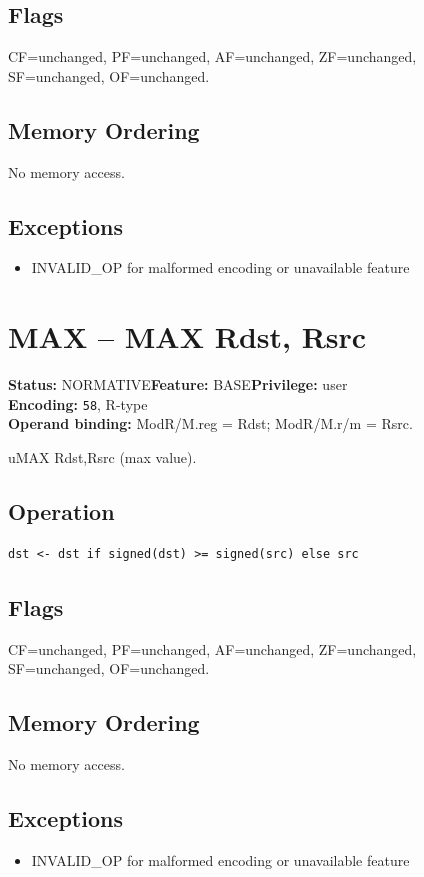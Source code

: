 \documentclass[10pt]{article}
\begin{document}
\subsection*{Flags}
CF=unchanged, PF=unchanged, AF=unchanged, ZF=unchanged, SF=unchanged, OF=unchanged.
\subsection*{Memory Ordering}
No memory access.
\subsection*{Exceptions}
\begin{itemize}
\item INVALID\_OP for malformed encoding or unavailable feature
\end{itemize}
\clearpage

\section{MAX -- MAX Rdst, Rsrc}
\textbf{Status:} NORMATIVE\quad \textbf{Feature:} BASE\quad \textbf{Privilege:} user\\
\textbf{Encoding:} \texttt{58}, R-type\\
\textbf{Operand binding:} ModR/M.reg = Rdst; ModR/M.r/m = Rsrc.

uMAX Rdst,Rsrc (max value).

\subsection*{Operation}
\begin{lstlisting}
dst <- dst if signed(dst) >= signed(src) else src
\end{lstlisting}
\subsection*{Flags}
CF=unchanged, PF=unchanged, AF=unchanged, ZF=unchanged, SF=unchanged, OF=unchanged.
\subsection*{Memory Ordering}
No memory access.
\subsection*{Exceptions}
\begin{itemize}
\item INVALID\_OP for malformed encoding or unavailable feature
\end{itemize}
\clearpage
\end{document}
